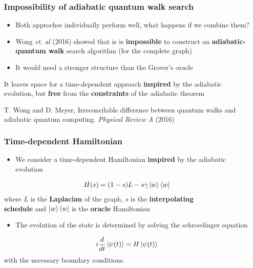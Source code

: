 \documentclass{beamer}
\newcommand{\bb}[1]{\textbf{\textcolor{darkish_blue}{#1}}}
\begin{document}
\begin{frame}
\frametitle{Impossibility of adiabatic quantum walk search}

\begin{itemize}
	\item Both approches individually perform well, what happens if we combine them? \vspace{0.6cm}
	\item Wong \textit{et. al} (2016) showed that is is \bb{impossible} to construct an \bb{adiabatic-quantum walk} search algorithm (for the complete graph)
	\item It would need a stronger structure than the Grover's oracle
\end{itemize}

\vspace{0.5cm}
{
\centering
\begin{tcolorbox}[width=9cm, colframe=darkblue, colback=white, halign=center, left=1.5pt, right =1.5pt]
\large It leaves space for a time-dependent approach \bb{inspired} by the adiabatic evolution, but \bb{free} from the \bb{constraints} of the adiabatic theorem
\end{tcolorbox}
}

\vspace{0.5cm}
\footnotesize T. Wong and D. Meyer, Irreconcilable difference between quantum walks and adiabatic quantum computing. \textit{Physical Review A} (2016)
\end{frame}


\begin{frame}
\frametitle{Time-dependent Hamiltonian}
\vspace{-0.5cm}
\begin{itemize}
	\item We consider a time-dependent Hamiltonian \bb{inspired} by the adiabatic evolution
\end{itemize}
\begin{equation*}
	H(s) = (1-s)L - s\gamma\ket{w}\bra{w} 
\end{equation*}
\hspace{0.8cm}where $L$ is the \bb{Laplacian} of the graph, $s$ is the \bb{interpolating\\\hspace{0.8cm}schedule} and $\ket{w}\bra{w}$ is the \bb{oracle} Hamiltonian

\vspace{0.5cm}
\begin{itemize}
	\item The evolution of the state is determined by solving the schroedinger equation
\end{itemize}
\begin{equation*}
	i\frac{d}{dt}\ket{\psi(t)} = H\ket{\psi(t)}
\end{equation*}
\hspace{0.8cm}with the necessary boundary conditions.

\end{frame}
\end{document}
